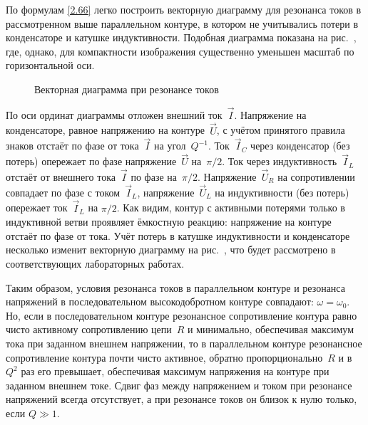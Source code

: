 По формулам \eqref{2.66} легко построить векторную диаграмму 
для резонанса токов в рассмотренном выше параллельном контуре, в котором 
не учитывались потери в конденсаторе и катушке индуктивности. 
Подобная диаграмма показана на рис.~, где, однако, для 
компактности изображения существенно уменьшен масштаб по горизонтальной оси.

\begin{figure}[h!]
	\centering
	\caption{Векторная диаграмма при резонансе токов}
\end{figure}

По оси ординат диаграммы отложен внешний ток~$\vec I$. Напряжение на конденсаторе, равное
напряжению на контуре~$\vec U$, с учётом принятого правила знаков отстаёт по
фазе от тока~$\vec I$ на угол~$Q^{-1}$. Ток~$\vec I_C$ через конденсатор (без
потерь) опережает по фазе напряжение~$\vec U$ на~$\pi/2$. Ток через
индуктивность~$\vec I_L$ отстаёт от внешнего тока~$\vec I$ по фазе на~$\pi/2$.
Напряжение~$\vec U_R$ на сопротивлении совпадает по фазе с током~$\vec I_L$,
напряжение~$\vec U_L$ на индуктивности (без потерь) опережает ток~$\vec I_L$ на
$\pi/2$. Как видим, контур с активными потерями только в индуктивной ветви
проявляет ёмкостную реакцию: напряжение на контуре отстаёт по фазе от тока. Учёт
потерь в катушке индуктивности и конденсаторе несколько изменит векторную
диаграмму на рис.~, что будет рассмотрено в соответствующих
лабораторных работах.

Таким образом, условия резонанса токов в параллельном контуре и резонанса
напряжений в последовательном высокодобротном контуре совпадают:
$\omega=\omega_0$. Но, если в последовательном контуре резонансное сопротивление
контура равно чисто активному сопротивлению цепи~$R$ и минимально, обеспечивая
максимум тока при заданном внешнем напряжении, то в параллельном контуре
резонансное сопротивление контура почти чисто активное, обратно
пропорционально~$R$ и в~$Q^2$ раз его превышает, обеспечивая максимум напряжения
на контуре при заданном внешнем токе. Сдвиг фаз между напряжением и током при
резонансе напряжений всегда отсутствует, а при резонансе токов он близок к нулю
только, если $Q\gg1$.


\label{sec:ust}

